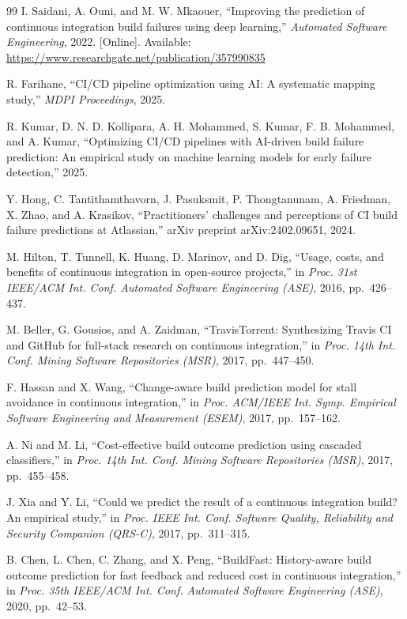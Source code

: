 \begin{thebibliography}{99}
 I. Saidani, A. Ouni, and M. W. Mkaouer, ``Improving the prediction of continuous integration build failures using deep learning,'' \emph{Automated Software Engineering}, 2022. [Online]. Available: \url{https://www.researchgate.net/publication/357990835}

 R. Farihane, ``CI/CD pipeline optimization using AI: A systematic mapping study,'' \emph{MDPI Proceedings}, 2025.

 R. Kumar, D. N. D. Kollipara, A. H. Mohammed, S. Kumar, F. B. Mohammed, and A. Kumar, ``Optimizing CI/CD pipelines with AI-driven build failure prediction: An empirical study on machine learning models for early failure detection,'' 2025.

 Y. Hong, C. Tantithamthavorn, J. Pasuksmit, P. Thongtanunam, A. Friedman, X. Zhao, and A. Krasikov, ``Practitioners' challenges and perceptions of CI build failure predictions at Atlassian,'' arXiv preprint arXiv:2402.09651, 2024.

 M. Hilton, T. Tunnell, K. Huang, D. Marinov, and D. Dig, ``Usage, costs, and benefits of continuous integration in open-source projects,'' in \emph{Proc. 31st IEEE/ACM Int. Conf. Automated Software Engineering (ASE)}, 2016, pp.~426--437.

 M. Beller, G. Gousios, and A. Zaidman, ``TravisTorrent: Synthesizing Travis CI and GitHub for full-stack research on continuous integration,'' in \emph{Proc. 14th Int. Conf. Mining Software Repositories (MSR)}, 2017, pp.~447--450.

 F. Hassan and X. Wang, ``Change-aware build prediction model for stall avoidance in continuous integration,'' in \emph{Proc. ACM/IEEE Int. Symp. Empirical Software Engineering and Measurement (ESEM)}, 2017, pp.~157--162.

 A. Ni and M. Li, ``Cost-effective build outcome prediction using cascaded classifiers,'' in \emph{Proc. 14th Int. Conf. Mining Software Repositories (MSR)}, 2017, pp.~455--458.

 J. Xia and Y. Li, ``Could we predict the result of a continuous integration build? An empirical study,'' in \emph{Proc. IEEE Int. Conf. Software Quality, Reliability and Security Companion (QRS-C)}, 2017, pp.~311--315.

 B. Chen, L. Chen, C. Zhang, and X. Peng, ``BuildFast: History-aware build outcome prediction for fast feedback and reduced cost in continuous integration,'' in \emph{Proc. 35th IEEE/ACM Int. Conf. Automated Software Engineering (ASE)}, 2020, pp.~42--53.


\end{thebibliography}
